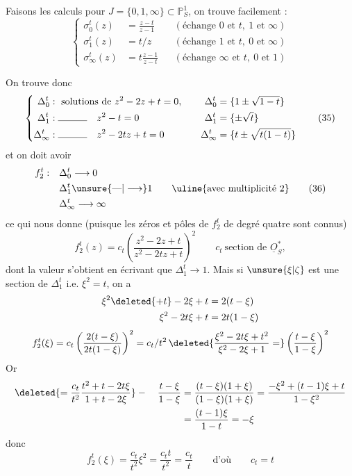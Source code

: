 Faisons les calculs pour $J=\{0,1,\infty\}\subset\mathbb P^1_S$, on trouve facilement :
\[
\left\{\begin{aligned}
\sigma_0^t(z)&=\frac{z-t}{z-1} &&(\text{échange }0\text{ et }t,\ 1\text{ et }\infty)\\
\sigma_1^t(z)&=t/z &&(\text{échange }1\text{ et }t,\ 0\text{ et }\infty)\\
\sigma_\infty^t(z)&=t\frac{z-1}{z-t} &&(\text{échange }\infty\text{ et }t,\ 0\text{ et }1)
\end{aligned}\right.
\tag*{(34)}
\]

On trouve donc
\[
\left\{\begin{aligned}
\Delta_0^t &: \text{ solutions de }z^2-2z+t=0,\quad &\Delta_0^t&=\{1\pm\sqrt{1-t}\}\\
\Delta_1^t &: \rule{3em}{.35pt}\quad z^2-t=0 &\Delta_1^t&=\{\pm\sqrt t\}\\
\Delta_\infty^t &: \rule{3em}{.35pt}\quad z^2-2tz+t=0 &\Delta_\infty^t&=\{t\pm\sqrt{t(1-t)}\}
\end{aligned}\right.
\tag*{(35)}
\]
et on doit avoir
\[
\begin{aligned}
f_2^t:\quad &\Delta_0^t\longrightarrow 0\\
&\Delta_1^t\unsure{\text{---}|\longrightarrow}1\\
&\Delta_\infty^t\longrightarrow\infty
\end{aligned}
\qquad\text{\uline{avec multiplicité 2}}
\tag*{(36)}
\]
ce qui nous donne (puisque les zéros et pôles de $f_2^t$ de degré quatre sont connus)
\[
f_2^t(z)=c_t\left(\frac{z^2-2z+t}{z^2-2tz+t}\right)^2
\qquad c_t\ \text{section de }\underline O_S^*,
\]
dont la valeur s'obtient en écrivant que $\Delta_1^t\longrightarrow1$. Mais si $\unsure{\xi|\zeta}$ est une section de $\Delta_1^t$ i.e. $\xi^2=t$, on a
\[
\begin{aligned}
\xi^2\deleted{+t}-2\xi+t&=2(t-\xi)\\
\xi^2-2t\xi+t&=2t(1-\xi)
\end{aligned}
\]
\[
f_2^t(\xi)=c_t\left(\frac{2(t-\xi)}{2t(1-\xi)}\right)^2
=c_t/t^2\,\deleted{\frac{\xi^2-2t\xi+t^2}{\xi^2-2\xi+1}=}\left(\frac{t-\xi}{1-\xi}\right)^2
\]
Or
\[
\begin{aligned}
\deleted{=\frac{c_t}{t^2}\frac{t^2+t-2t\xi}{1+t-2\xi}}-\quad
\frac{t-\xi}{1-\xi}&=\frac{(t-\xi)(1+\xi)}{(1-\xi)(1+\xi)}
=\frac{-\xi^2+(t-1)\xi+t}{1-\xi^2}\\
&=\frac{(t-1)\xi}{1-t}=-\xi
\end{aligned}
\]
donc
\[
 f_2^t(\xi)=\frac{c_t}{t^2}\xi^2=\frac{c_t t}{t^2}=\frac{c_t}{t}
 \qquad\text{d'où}\qquad c_t=t
\]
